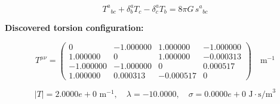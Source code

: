 
\begin{equation}
  T^a{}_{bc} + \delta^a_b T_c - \delta^a_c T_b = 8\pi G \, s^a{}_{bc}
\end{equation}

\textbf{Discovered torsion configuration:}

\begin{equation}
  T^{\mu\nu} = \begin{pmatrix}
    0 & -1.000000 & 1.000000 & -1.000000 \\
    1.000000 & 0 & 1.000000 & -0.000313 \\
    -1.000000 & -1.000000 & 0 & 0.000517 \\
    1.000000 & 0.000313 & -0.000517 & 0
  \end{pmatrix} \quad \text{m}^{-1}
\end{equation}

\begin{equation}
  |T| = 2.0000e+0 \text{ m}^{-1}, \quad
  \lambda = -10.0000, \quad
  \sigma = 0.0000e+0 \text{ J}\cdot\text{s/m}^3
\end{equation}